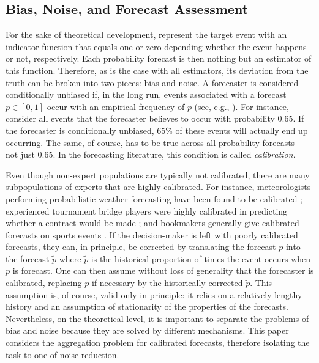 \documentclass[12pt]{article}
\theoremstyle{definition}
\theoremstyle{definition}
\def\pt{\tilde{p}}
\begin{document}
\subsection{Bias, Noise, and Forecast Assessment}
\label{BiasNoise}
For the sake of theoretical development,  represent the target event with an
indicator function that equals one or zero depending whether the event
happens or not, respectively. Each probability forecast is then nothing but an
estimator of this function. Therefore, as is the case with
all estimators, its deviation from the truth can be broken into two
pieces: bias and noise. A forecaster
is considered conditionally unbiased if, in the long run, events associated
with a forecast $p \in [0,1]$ occur with an empirical frequency of $p$ (see, e.g., \citealt{degroot1983comparison}). For
instance, consider all events that the forecaster believes to occur
with probability $0.65$. If the forecaster is conditionally unbiased, $65$\% of
these events will actually end up occurring. The same, of course, has
to be true across all probability forecasts -- not just $0.65$.  In the forecasting literature, this condition is called \textit{calibration}.


Even though non-expert populations are typically not calibrated, there are many subpopulations of experts that are highly
calibrated. For instance, meteorologists performing probabilistic
weather forecasting have been found to be calibrated
\citep{murphy1977reliability}; experienced tournament bridge
players were highly calibrated in predicting whether a contract would
be made \citep{keren1987facing}; and bookmakers generally give
calibrated forecasts on sports events \citep{dowie1976efficiency,
yates1985conditional}. If the decision-maker is left with poorly
calibrated forecasts, they can, in principle, be corrected by
translating the forecast $p$ into the forecast $\pt$ where $\pt$ is
the historical proportion of times the event occurs when $p$ is
forecast.  One can then assume without loss of generality that the
forecaster is calibrated, replacing $p$ if necessary by the
historically corrected $\pt$. This assumption is, of course, valid
only in principle: it relies on a relatively lengthy history and an
assumption of stationarity of the properties of the forecasts.  
Nevertheless, on the
theoretical level, it is important to separate the problems of bias
and noise because they are solved by different mechanisms.  This
paper considers the aggregation problem for calibrated forecasts,
therefore isolating the task to one of noise reduction.
\end{document}
